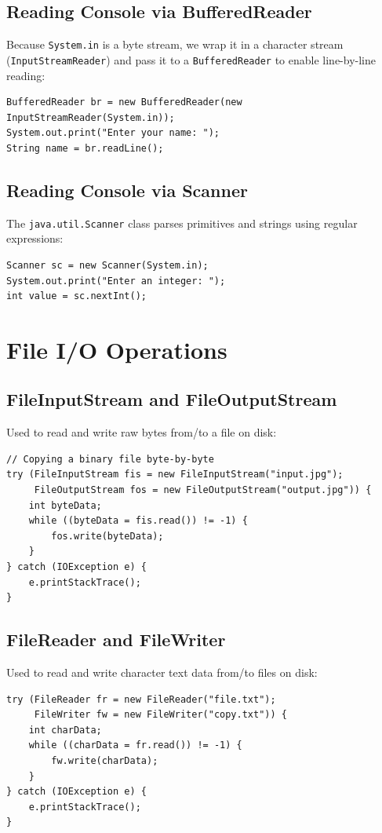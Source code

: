 \documentclass[12pt,a4paper]{article}
\begin{document}
\subsection{Reading Console via BufferedReader}
Because \texttt{System.in} is a byte stream, we wrap it in a character stream (\texttt{InputStreamReader}) and pass it to a \texttt{BufferedReader} to enable line-by-line reading:
\begin{verbatim}
BufferedReader br = new BufferedReader(new InputStreamReader(System.in));
System.out.print("Enter your name: ");
String name = br.readLine();
\end{verbatim}

\subsection{Reading Console via Scanner}
The \texttt{java.util.Scanner} class parses primitives and strings using regular expressions:
\begin{verbatim}
Scanner sc = new Scanner(System.in);
System.out.print("Enter an integer: ");
int value = sc.nextInt();
\end{verbatim}

\section{File I/O Operations}

\subsection{FileInputStream and FileOutputStream}
Used to read and write raw bytes from/to a file on disk:
\begin{verbatim}
// Copying a binary file byte-by-byte
try (FileInputStream fis = new FileInputStream("input.jpg");
     FileOutputStream fos = new FileOutputStream("output.jpg")) {
    int byteData;
    while ((byteData = fis.read()) != -1) {
        fos.write(byteData);
    }
} catch (IOException e) {
    e.printStackTrace();
}
\end{verbatim}

\subsection{FileReader and FileWriter}
Used to read and write character text data from/to files on disk:
\begin{verbatim}
try (FileReader fr = new FileReader("file.txt");
     FileWriter fw = new FileWriter("copy.txt")) {
    int charData;
    while ((charData = fr.read()) != -1) {
        fw.write(charData);
    }
} catch (IOException e) {
    e.printStackTrace();
}
\end{verbatim}
\end{document}
